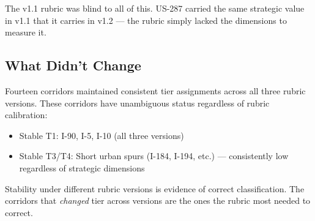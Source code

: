 The v1.1 rubric was blind to all of this. US-287 carried the same strategic value in v1.1 that it carries in v1.2 --- the rubric simply lacked the dimensions to measure it.

\subsection{What Didn't Change}

Fourteen corridors maintained consistent tier assignments across all three rubric versions. These corridors have unambiguous status regardless of rubric calibration:
\begin{itemize}
\item Stable T1: I-90, I-5, I-10 (all three versions)
\item Stable T3/T4: Short urban spurs (I-184, I-194, etc.) — consistently low regardless of strategic dimensions
\end{itemize}

Stability under different rubric versions is evidence of correct classification. The corridors that \textit{changed} tier across versions are the ones the rubric most needed to correct.
